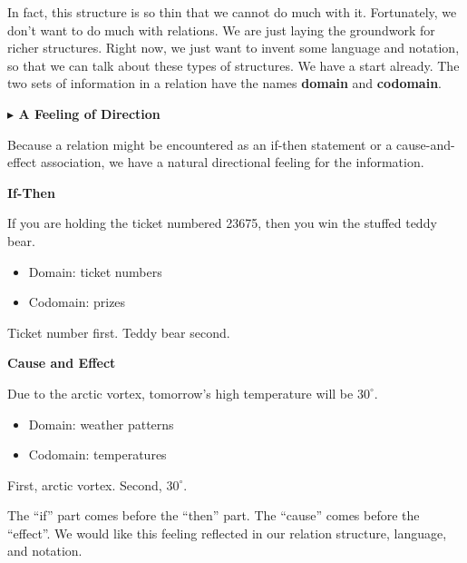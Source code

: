 \documentclass{ximera}
\begin{document}
In fact, this structure is so thin that we cannot do much with it.  Fortunately, we don't want to do much with relations.  We are just laying the groundwork for richer structures.  Right now, we just want to invent some language and notation, so that we can talk about these types of structures. We have a start already. The two sets of information in a relation have the names \textbf{\textcolor{purple!85!blue}{domain}} and \textbf{\textcolor{purple!85!blue}{codomain}}.




\textbf{\textcolor{red!70!black}{$\blacktriangleright$ A Feeling of Direction}}



Because a relation might be encountered as an if-then statement or a cause-and-effect association, we have a natural directional feeling for the information.  



\begin{idea} \textbf{\textcolor{blue!55!black}{If-Then}}

If you are holding the ticket numbered 23675, then you win the stuffed teddy bear. 


\begin{itemize}
    \item Domain: ticket numbers
    \item Codomain: prizes
\end{itemize}

Ticket number first. Teddy bear second.

\end{idea}



\begin{idea} \textbf{\textcolor{blue!55!black}{Cause and Effect}}

Due to the arctic vortex, tomorrow's high temperature will be $30^{\circ}$.  

\begin{itemize}
    \item Domain: weather patterns
    \item Codomain: temperatures
\end{itemize}

First, arctic vortex. Second, $30^{\circ}$.

\end{idea}

The ``if'' part comes before the ``then'' part.  The ``cause'' comes before the ``effect''.  We would like this feeling reflected in our relation structure, language, and notation.  
\end{document}
